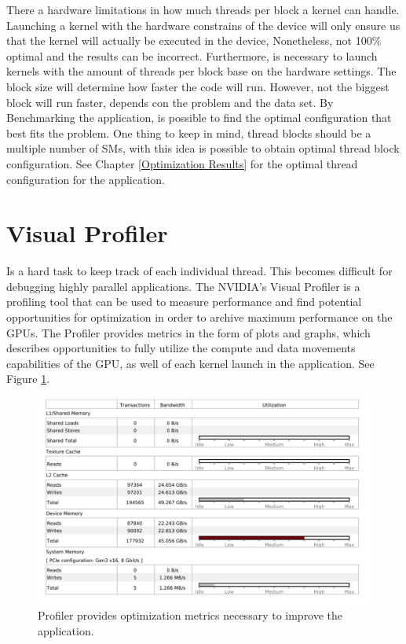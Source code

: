 There a hardware limitations in how much threads per block a kernel can handle. Launching a kernel with the hardware constrains of the device will only ensure us that the kernel will actually be executed in the device, Nonetheless, not 100$\%$ optimal and the results can be incorrect. Furthermore, is necessary to launch kernels with the amount of threads per block base on the hardware settings. The block size will determine how faster the code will run. However, not the biggest block will run faster, depends con the problem and the data set. By Benchmarking the application, is possible to find the optimal configuration that best fits the problem. One thing to keep in mind, thread blocks should be a multiple number of SMs, with this idea is possible to obtain optimal thread block configuration. See Chapter \ref{Optimization Results} for the optimal thread configuration for the application.

\section{Visual Profiler}

Is a hard task to keep track of each individual thread. This becomes difficult for debugging highly parallel applications. The NVIDIA's Visual Profiler is a profiling tool that can be used to measure performance and find potential opportunities for optimization in order to archive maximum performance on the GPUs. The Profiler provides metrics in the form of plots and graphs, which describes opportunities to fully utilize the compute and data movements capabilities of the GPU, as well of each kernel launch in the application. See Figure \ref{fig:visualgraph}.

\begin{figure}[htbp]
	\centering
		\includegraphics[width=1.0\textwidth]{Figures/visualgraph.png}
		\smallskip
	\caption[Visual Profiler metrics]{Profiler provides optimization metrics necessary to improve the application.}
	\label{fig:visualgraph}
\end{figure}

